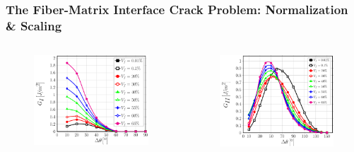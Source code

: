 \documentclass[first,firstsupp,lastsupp,last,hyperref,table]{ETHclass}
\begin{document}
\begin{frame}
\frametitle{\vspace{0.3cm}\small The Fiber-Matrix Interface Crack Problem: Normalization \& Scaling}
\vspace{-1.cm}
\centering
\begin{columns}[c]
\begin{column}{0.5\textwidth}
\begin{figure}
\includegraphics[width=\columnwidth]{GI-free-dim.pdf}
\end{figure}
\end{column}
\begin{column}{0.5\textwidth}
\begin{figure}
\includegraphics[width=\columnwidth]{GII-free-dim.pdf}

\end{figure}
\end{column}
\end{columns}
\end{frame}
\end{document}
